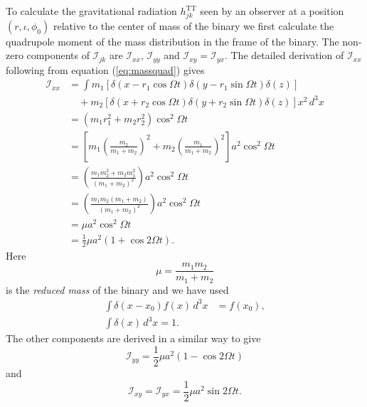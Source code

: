 To calculate the gravitational radiation $h_{jk}^\mathrm{TT}$ seen by an
observer at a position $(r,\iota,\phi_0)$ relative to the center of mass of
the binary we first calculate the quadrupole moment of the mass distribution
in the frame of the binary. 
The non-zero components of $\mathcal{I}_{jk}$ are $\mathcal{I}_{xx}$,
$\mathcal{I}_{yy}$ and $\mathcal{I}_{xy} = \mathcal{I}_{yx}$. The detailed
derivation of  $\mathcal{I}_{xx}$ following from equation (\ref{eq:massquad})
gives
\begin{equation}
\begin{split}
\mathcal{I}_{xx} &= \int 
m_1\left[\delta(x - r_1 \cos\Omega t) \delta(y - r_1 \sin\Omega
t)\delta(z)\right] \\
&\quad +
m_2\left[\delta(x + r_2 \cos\Omega t) \delta(y + r_2 \sin\Omega
t)\delta(z)\right] x^2\, d^3 x \\
&= (m_1 r_1^2 + m_2 r_2^2) \cos^2 \Omega t \\
&= \left[ m_1 \left(\frac{m_2}{m_1 + m_2}\right)^2 + 
m_2 \left(\frac{m_1}{m_1 + m_2}\right)^2 \right] a^2\cos^2\Omega t \\
&= \left(  \frac{m_1 m_2^2 + m_2 m_1^2}{(m_1 + m_2)^2}\right) a^2\cos^2\Omega t \\
&= \left( \frac{m_1 m_2 (m_1 + m_2)}{(m_1 + m_2)^2} \right) a^2\cos^2\Omega t \\
&= \mu a^2\cos^2\Omega t \\
&= \frac{1}{2} \mu a^2 \left(1 + \cos 2 \Omega t \right).
\end{split}
\end{equation}
Here
\begin{equation}
\mu = \frac{m_1 m_2}{m_1 + m_2} 
\end{equation}
is the \emph{reduced mass} of the binary and we have used
\begin{equation}
\begin{split}
\int \delta(x-x_0) f(x)\, d^3x &= f(x_0), \\
\int \delta(x)\, d^3x = 1.
\end{split}
\end{equation}
The other components are derived in a similar way to give
\begin{equation}
\mathcal{I}_{yy} = \frac{1}{2} \mu a^2 \left(1 - \cos 2 \Omega t \right)
\end{equation}
and 
\begin{equation}
\mathcal{I}_{xy} =
\mathcal{I}_{yx} =
\frac{1}{2} \mu a^2 \sin 2 \Omega t.
\end{equation}
